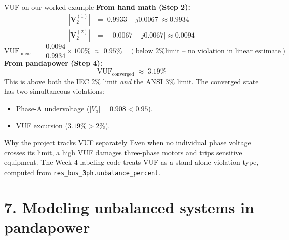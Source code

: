 \documentclass[aspectratio=169,10pt]{beamer}
\newcommand{\code}[1]{\texttt{#1}}
\begin{document}
\begin{frame}[shrink=5]{VUF on our worked example}
\textbf{From hand math (Step 2):}
\begin{align*}
|\mathbf{V}^{(1)}_2| &= |0.9933 - j0.0067| \approx 0.9934 \\
|\mathbf{V}^{(2)}_2| &= |-0.0067 - j0.0067| \approx 0.0094
\end{align*}
\begin{equation*}
\text{VUF}_{\text{linear}} \;=\; \frac{0.0094}{0.9934} \times 100\% \;\approx\; \mathbf{0.95\%} \quad (\text{below 2\% limit -- no violation in linear estimate})
\end{equation*}
\vspace{0.2em}
\textbf{From pandapower (Step 4):}
\begin{equation*}
\boxed{\;\text{VUF}_{\text{converged}} \;\approx\; \mathbf{3.19\%}\;}
\end{equation*}
This is above both the IEC 2\% limit \emph{and} the ANSI 3\% limit. The converged state has two simultaneous violations:
\begin{itemize}
  \item Phase-A undervoltage ($|V_a| = 0.908 < 0.95$).
  \item VUF excursion ($3.19\% > 2\%$).
\end{itemize}
\vspace{0.2em}
\begin{alertblock}{Why the project tracks VUF separately}
Even when no individual phase voltage crosses its limit, a high VUF damages three-phase motors and trips sensitive equipment. The Week 4 labeling code treats VUF as a stand-alone violation type, computed from \code{res\_bus\_3ph.unbalance\_percent}.
\end{alertblock}
\end{frame}

\section*{7. Modeling unbalanced systems in pandapower}
\end{document}
